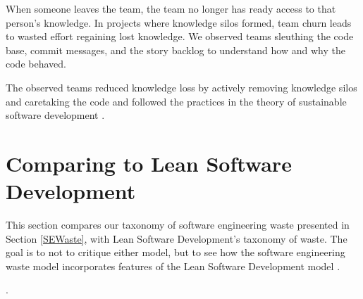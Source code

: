 When someone leaves the team, the team no longer has ready access to that person's knowledge. In projects where knowledge silos formed, team churn leads to wasted effort regaining lost knowledge. We observed teams sleuthing the code base, commit messages, and the story backlog to understand how and why the code behaved.  


The observed teams reduced knowledge loss by actively removing knowledge silos and caretaking the code and followed the practices in the theory of sustainable software development \cite{SedanoSustainableSoftware}.


\section{Comparing to Lean Software Development}
\label{LeanSoftwareDevelopmentComparison}


This section compares our taxonomy of software engineering waste presented in Section \ref{SEWaste}, with Lean Software Development's taxonomy of waste. The goal is to not to critique either model, but to see how the software engineering waste model incorporates features of the Lean Software Development model \cite{PoppendieckConceptToCash}. 


 \cite{GlaserTheoreticalSensitivity}. 




